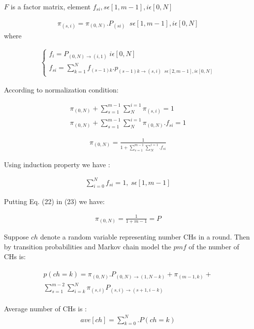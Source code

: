 \documentclass[10pt, conference, compsocconf]{IEEEtran}
\begin{document}
$F$ is a factor matrix, element $f_{si}, s\epsilon[1,m-1],i\epsilon[0,N]$

\begin{eqnarray}
\pi_{(s,i)}=\pi_{(0,N)}.P_{(si)} \;\;s\epsilon[1,m-1],i\epsilon[0,N]
\end{eqnarray}
where

\begin{eqnarray}
\begin{cases}
 f_{i} =P_{(0,N)\longrightarrow(i,1)}       \;i\epsilon[0,N]\\
 f_{si}=\sum^{N}_{k=1}f_{(s-1)k}.p_{(s-1)k\longrightarrow(s,i)\;\; s\epsilon[2,m-1],i\epsilon[0,N]}
 \end{cases}
\end{eqnarray}

According to normalization condition:

\begin{eqnarray}
\pi_{(0,N)}+\sum^{m-1}_{s=1}\sum^{i=1}_{N}\pi_{(s,i)}=1\\
  \pi_{(0,N)}+\sum^{m-1}_{s=1}\sum^{i=1}_{N}\pi_{(0,N)}.f_{si}=1
\end{eqnarray}

\begin{eqnarray}
\pi_{(0,N)}=\frac{1}{1+\sum^{m-1}_{s=1}\sum^{i=1}_{N}.f_{si}}
\end{eqnarray}

Using induction property we have :

\begin{eqnarray}
\sum^{N}_{i=0} f_{si}=1, \; s\epsilon[1,m-1]
\end{eqnarray}

Putting Eq. (22) in (23) we have:

\begin{eqnarray}
\pi_{(0,N)}=\frac{1}{1+m-1}=P
\end{eqnarray}

Suppose $ch$ denote a random variable representing number CHs in a round. Then by transition probabilities and Markov chain model the $pmf$ of the number of CHs is:

\begin{eqnarray}
\begin{split}
p(ch=k)=\pi_{(0,N)}.P _{(0,N)\rightarrow (1, N-k)}+\pi_{(m-1,k)}+ \\ \sum^{m-2}_{s=1}\sum^{N}_{i=k}\pi_{(s,i)}P_{(s,i)\rightarrow(s+1,i-k)}
\end{split}
\end{eqnarray}


Average number of CHs is :
\begin{eqnarray}
ave[ch]=\sum^{N}_{k=0}.P(ch=k)
\end{eqnarray}
\end{document}

